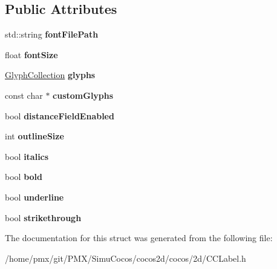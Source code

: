 \subsection*{Public Attributes}
\begin{DoxyCompactItemize}
\item 
\mbox{\label{struct__ttfConfig_ad12176ab85f05707aff75365da58d693}} 
std\+::string {\bfseries font\+File\+Path}
\item 
\mbox{\label{struct__ttfConfig_a3756376736bfedc26d560d6f61420c25}} 
float {\bfseries font\+Size}
\item 
\mbox{\label{struct__ttfConfig_a177d0ac6bfa83ff53f486474565b7da2}} 
\hyperlink{group__base_gac5e83e2fc436edc7833f2bcabad984f3}{Glyph\+Collection} {\bfseries glyphs}
\item 
\mbox{\label{struct__ttfConfig_ad211da5e49a5d08235705486ea8a4d88}} 
const char $\ast$ {\bfseries custom\+Glyphs}
\item 
\mbox{\label{struct__ttfConfig_a5befc6b303c6c7c431c04621810083e1}} 
bool {\bfseries distance\+Field\+Enabled}
\item 
\mbox{\label{struct__ttfConfig_ac3405d0c31582ce9281ad228c25d0c9e}} 
int {\bfseries outline\+Size}
\item 
\mbox{\label{struct__ttfConfig_a9f602ca6458e0c369fc88d44ba8c416b}} 
bool {\bfseries italics}
\item 
\mbox{\label{struct__ttfConfig_a4b6082ae3c4b58298596404775eab3d9}} 
bool {\bfseries bold}
\item 
\mbox{\label{struct__ttfConfig_a047b4464c524e5e529c2cb83d6da67ab}} 
bool {\bfseries underline}
\item 
\mbox{\label{struct__ttfConfig_afb32df00e8eafb71fad76a055d55f555}} 
bool {\bfseries strikethrough}
\end{DoxyCompactItemize}


The documentation for this struct was generated from the following file\+:\begin{DoxyCompactItemize}
\item 
/home/pmx/git/\+P\+M\+X/\+Simu\+Cocos/cocos2d/cocos/2d/C\+C\+Label.\+h\end{DoxyCompactItemize}
